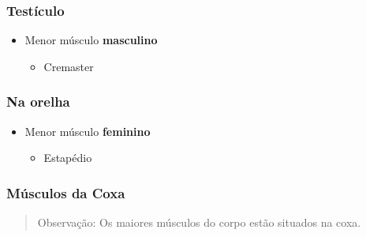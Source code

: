 \documentclass[
]{book}
\providecommand{\tightlist}{%
  \setlength{\itemsep}{0pt}\setlength{\parskip}{0pt}}
\begin{document}
\hypertarget{testuxedculo}{%
\subsubsection{Testículo}\label{testuxedculo}}

\begin{itemize}
\tightlist
\item
  Menor músculo \textbf{masculino}

  \begin{itemize}
  \tightlist
  \item
    Cremaster
  \end{itemize}
\end{itemize}

\hypertarget{na-orelha}{%
\subsubsection{Na orelha}\label{na-orelha}}

\begin{itemize}
\tightlist
\item
  Menor músculo \textbf{feminino}

  \begin{itemize}
  \tightlist
  \item
    Estapédio
  \end{itemize}
\end{itemize}

\hypertarget{muxfasculos-da-coxa}{%
\subsubsection{Músculos da Coxa}\label{muxfasculos-da-coxa}}

\begin{quote}
Observação: Os maiores músculos do corpo estão situados na coxa.
\end{quote}
\end{document}
